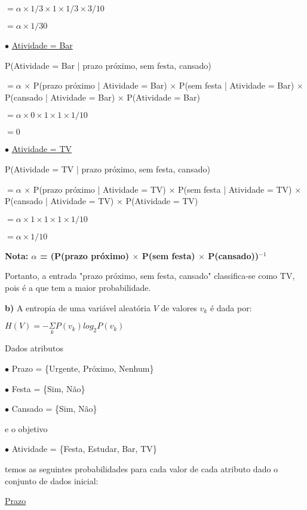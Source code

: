 \documentclass{article}
\begin{document}
\quad $= \alpha \times 1/3 \times 1 \times 1/3 \times 3/10$

\quad $= \alpha \times 1/30$

\bigskip
\quad $\bullet$ \underline{Atividade = Bar}

\quad P(Atividade = Bar | prazo próximo, sem festa, cansado)

\quad $= \alpha$ $\times$ P(prazo próximo | Atividade = Bar) $\times$ P(sem festa | Atividade = Bar) $\times$ P(cansado | Atividade = Bar) $\times$ P(Atividade = Bar)

\quad $= \alpha \times 0 \times 1 \times 1 \times 1/10$

\quad $= 0$

\bigskip
\quad $\bullet$ \underline{Atividade = TV}

\quad P(Atividade = TV | prazo próximo, sem festa, cansado)

\quad $= \alpha$ $\times$ P(prazo próximo | Atividade = TV) $\times$ P(sem festa | Atividade = TV) $\times$ P(cansado | Atividade = TV) $\times$ P(Atividade = TV)

\quad $= \alpha \times 1 \times 1 \times 1 \times 1/10$

\quad $= \alpha \times 1/10$

\bigskip
\quad \textbf{Nota: $\alpha$ = (P(prazo próximo) $\times$ P(sem festa) $\times$ P(cansado))$^{-1}$}

\bigskip
\quad Portanto, a entrada "prazo próximo, sem festa, cansado" classifica-se como TV, pois é a que tem a maior probabilidade.

\bigskip
\quad \textbf{b)} A entropia de uma variável aleatória $V$ de valores $v_{k}$ é dada por:

\begin{center}
$H(V) = -\underset{k}{\Sigma}P(v_{k})log_{2}P(v_{k})$
\end{center}

\quad Dados atributos

\quad $\bullet$ Prazo = \{Urgente, Próximo, Nenhum\}

\quad $\bullet$ Festa = \{Sim, Não\}

\quad $\bullet$ Cansado = \{Sim, Não\}

\bigskip
\quad e o objetivo

\quad $\bullet$ Atividade = \{Festa, Estudar, Bar, TV\}

\bigskip
\quad temos as seguintes probabilidades para cada valor de cada atributo dado o conjunto de dados inicial:

\quad \underline{Prazo}
\end{document}
